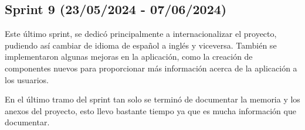 \hfill

\subsection{Sprint 9 (23/05/2024 - 07/06/2024)}

Este último sprint, se dedicó principalmente a internacionalizar el proyecto, pudiendo así cambiar de idioma de español a inglés y viceversa. También se implementaron algunas mejoras en la aplicación, como la creación de componentes nuevos para proporcionar más información acerca de la aplicación a los usuarios.

En el último tramo del sprint tan solo se terminó de documentar la memoria y los anexos del proyecto, esto llevo bastante tiempo ya que es mucha información que documentar.


